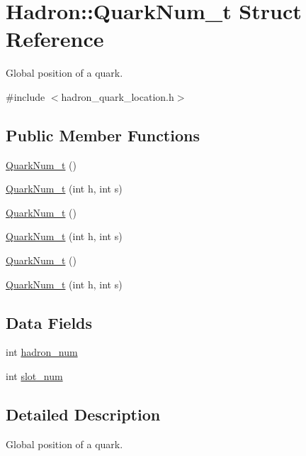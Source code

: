 \hypertarget{structHadron_1_1QuarkNum__t}{}\section{Hadron\+:\+:Quark\+Num\+\_\+t Struct Reference}
\label{structHadron_1_1QuarkNum__t}


Global position of a quark.  




{\ttfamily \#include $<$hadron\+\_\+quark\+\_\+location.\+h$>$}

\subsection*{Public Member Functions}
\begin{DoxyCompactItemize}
\item 
\mbox{\hyperlink{structHadron_1_1QuarkNum__t_aa60e284c846b1161380747994dd6c06b}{Quark\+Num\+\_\+t}} ()
\item 
\mbox{\hyperlink{structHadron_1_1QuarkNum__t_a7a990500f4d5bded0bfb10c0e9096263}{Quark\+Num\+\_\+t}} (int h, int s)
\item 
\mbox{\hyperlink{structHadron_1_1QuarkNum__t_aa60e284c846b1161380747994dd6c06b}{Quark\+Num\+\_\+t}} ()
\item 
\mbox{\hyperlink{structHadron_1_1QuarkNum__t_a7a990500f4d5bded0bfb10c0e9096263}{Quark\+Num\+\_\+t}} (int h, int s)
\item 
\mbox{\hyperlink{structHadron_1_1QuarkNum__t_aa60e284c846b1161380747994dd6c06b}{Quark\+Num\+\_\+t}} ()
\item 
\mbox{\hyperlink{structHadron_1_1QuarkNum__t_a7a990500f4d5bded0bfb10c0e9096263}{Quark\+Num\+\_\+t}} (int h, int s)
\end{DoxyCompactItemize}
\subsection*{Data Fields}
\begin{DoxyCompactItemize}
\item 
int \mbox{\hyperlink{structHadron_1_1QuarkNum__t_a837a30c976c28b1b6d7c597e755b5900}{hadron\+\_\+num}}
\item 
int \mbox{\hyperlink{structHadron_1_1QuarkNum__t_a6d0d3b601e76b87d83358c5fda8a58b8}{slot\+\_\+num}}
\end{DoxyCompactItemize}


\subsection{Detailed Description}
Global position of a quark. 

